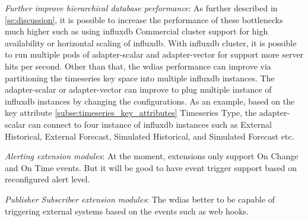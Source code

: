 \emph{Further improve hierarchical database performance}:
As further described in \cref{se:discussion}, it is possible to increase the performance of these bottlenecks much higher such as using \acrshort{influxdb} Commercial cluster support for high availability or horizontal scaling of \acrshort{influxdb}. With \acrshort{influxdb} cluster, it is possible to run multiple pods of adapter-scalar and adapter-vector for support more server hits per second.
Other than that, the \acrshort{wdias} performance can improve via partitioning the timeseries key space into multiple \acrshort{influxdb} instances. The adapter-scalar or adapter-vector can improve to plug multiple instance of \acrshort{influxdb} instances by changing the configurations. As an example, based on the key attribute \cref{subse:timeseries_key_attributes} Timeseries Type, the adapter-scalar can connect to four instance of \acrshort{influxdb} instances such as  External Historical, External Forecast, Simulated Historical, and Simulated Forecast etc.

\emph{Alerting extension modules}:
At the moment, extensions only support On Change and On Time events. But it will be good to have event trigger support based on reconfigured alert level.

\emph{Publisher Subscriber extension modules}:
The \acrshort{wdias} better to be capable of triggering external systems based on the events such as web hooks.


